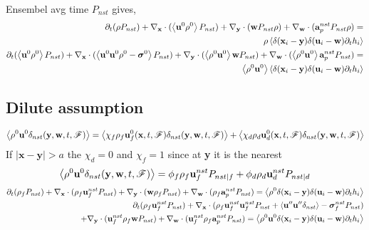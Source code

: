 Ensembel avg time $P_{nst}$ gives, 
\begin{align*}
    \partial_t (\rho P_{nst}) 
    + {\mathbf{\nabla}_\textbf{x}} \cdot (\left<\textbf{u}^0 \rho^0 \right> P_{nst})
    + {\mathbf{\nabla}_\textbf{y}} \cdot (\textbf{w}  P_{nst} \rho)
    + {\mathbf{\nabla}_\textbf{w}} \cdot (\textbf{a}_p^{nst} P_{nst}\rho)
    = \\
    \rho \left<\delta(\textbf{x}_i -\textbf{y}) \delta(\textbf{u}_i - \textbf{w}) \partial_t h_i \right>
    \\
    \partial_t (\left<\textbf{u}^0 \rho^0 \right> P_{nst})
    + {\mathbf{\nabla}_\textbf{x}} \cdot (\left<\textbf{u}^0 \textbf{u}^0 \rho^0  - \bm\sigma^0 \right> P_{nst})
    + {\mathbf{\nabla}_\textbf{y}} \cdot ( \left<\rho^0 \textbf{u}^0\right> \textbf{w}   P_{nst} )
    + {\mathbf{\nabla}_\textbf{w}} \cdot ( \left<\rho^0 \textbf{u}^0\right> \textbf{a}_p^{nst} P_{nst} )
    = \\
    \left<\rho^0 \textbf{u}^0\right>  
    \left<\delta(\textbf{x}_i -\textbf{y}) \delta(\textbf{u}_i - \textbf{w}) \partial_t h_i \right>
    \\
\end{align*}


\subsection*{Dilute assumption}
\begin{equation*}
    \left<\rho^0 \textbf{u}^0 \delta_{nst}(\textbf{y},\textbf{w},t,\mathscr{F})\right> 
    = 
    \left<\chi_f\rho_f \textbf{u}^0_f(\textbf{x},t,\mathscr{F}) \delta_{nst}(\textbf{y},\textbf{w},t,\mathscr{F})\right> 
    + \left<\chi_d\rho_d \textbf{u}^0_d(\textbf{x},t,\mathscr{F}) \delta_{nst}(\textbf{y},\textbf{w},t,\mathscr{F})\right> 
\end{equation*}
If $|\textbf{x}-\textbf{y}| > a$ the $\chi_d = 0$ and $\chi_f = 1$ since at \textbf{y} it is the nearest
\begin{equation*}
    \left<\rho^0 \textbf{u}^0 \delta_{nst}(\textbf{y},\textbf{w},t,\mathscr{F})\right> 
    = 
    \phi_f \rho_f \textbf{u}_f^{nst} P_{nst|f}
    + \phi_d \rho_d \textbf{u}_d^{nst} P_{nst|d}
\end{equation*}
\begin{align*}
    \partial_t (\rho_f P_{nst}) 
    + {\mathbf{\nabla}_\textbf{x}} \cdot (\rho_f \textbf{u}_f^{nst} P_{nst})
    + {\mathbf{\nabla}_\textbf{y}} \cdot (\textbf{w}   \rho_f P_{nst})
    + {\mathbf{\nabla}_\textbf{w}} \cdot ( \rho_f \textbf{a}_p^{nst} P_{nst})
    = 
    \left<\rho^0 \delta(\textbf{x}_i -\textbf{y}) \delta(\textbf{u}_i - \textbf{w}) \partial_t h_i \right>
    \\
    \partial_t ( \rho_f\textbf{u}_f^{nst} P_{nst})
    + {\mathbf{\nabla}_\textbf{x}} \cdot ( \rho_f \textbf{u}_f^{nst}\textbf{u}_f^{nst}P_{nst} + \left<\textbf{u}''\textbf{u}''\delta_{nst}\right> - \bm\sigma_f^{nst} P_{nst})\\
    + {\mathbf{\nabla}_\textbf{y}} \cdot (\textbf{u}^{nst}_f \rho_f \textbf{w}   P_{nst} )
    + {\mathbf{\nabla}_\textbf{w}} \cdot (\textbf{u}^{nst}_f \rho_f \textbf{a}_p^{nst} P_{nst} )
    = \left<\rho^0 \textbf{u}^0  
    \delta(\textbf{x}_i -\textbf{y}) \delta(\textbf{u}_i - \textbf{w}) \partial_t h_i \right>
    \\
\end{align*}

